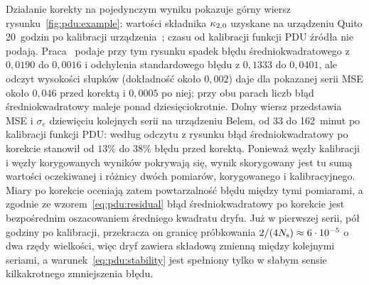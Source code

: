 Działanie korekty na pojedynczym wyniku pokazuje górny wiersz rysunku~\ref{fig:pdu:example}: wartości składnika $\kappa_{2,0}$ uzyskane na urządzeniu Quito 20~godzin po kalibracji urządzenia~\cite{werner_magisterka_2022}; czasu od kalibracji funkcji PDU źródła nie podają.
Praca~\cite{werner_experiment_driven_2022} podaje przy tym rysunku spadek błędu średniokwadratowego z $0{,}0190$ do $0{,}0016$ i odchylenia standardowego błędu z $0{,}1333$ do $0{,}0401$, ale odczyt wysokości słupków (dokładność około $0{,}002$) daje dla pokazanej serii MSE około $0{,}046$ przed korektą i $0{,}0005$ po niej; przy obu parach liczb błąd średniokwadratowy maleje ponad dziesięciokrotnie.
%
Dolny wiersz przedstawia MSE i $\sigma_e$ dziewięciu kolejnych serii na urządzeniu Belem, od 33 do 162~minut po kalibracji funkcji PDU: według odczytu z rysunku błąd średniokwadratowy po korekcie stanowił od $13\%$ do $38\%$ błędu przed korektą.
Ponieważ węzły kalibracji i węzły korygowanych wyników pokrywają się, wynik skorygowany jest tu sumą wartości oczekiwanej i różnicy dwóch pomiarów, korygowanego i kalibracyjnego.
Miary po korekcie oceniają zatem powtarzalność błędu między tymi pomiarami, a zgodnie ze wzorem~\eqref{eq:pdu:residual} błąd średniokwadratowy po korekcie jest bezpośrednim oszacowaniem średniego kwadratu dryfu.
Już w pierwszej serii, pół godziny po kalibracji, przekracza on granicę próbkowania $2/(4N_{\mathrm{s}})\approx 6\cdot10^{-5}$ o dwa rzędy wielkości, więc dryf zawiera składową zmienną między kolejnymi seriami, a warunek~\eqref{eq:pdu:stability} jest spełniony tylko w słabym sensie kilkakrotnego zmniejszenia błędu.

